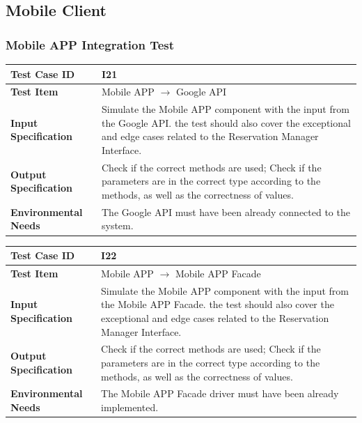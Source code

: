 \documentclass[a4paper,11pt]{article}
\begin{document}
	\subsection{Mobile Client}
		\subsubsection{Mobile APP Integration Test}
		\begin{table}[H] 
\begin{center}
\renewcommand\arraystretch{1.5}
\begin{tabular}{|p{5cm}|p{7cm}|}
 \hline
\textbf{Test Case ID}& I21\\
 \hline
\textbf{Test Item}&Mobile APP $\rightarrow$ Google API\\
 \hline
\textbf{Input Specification}&Simulate the Mobile APP component with the input from the Google API. the test should also cover the exceptional and edge cases related to the Reservation Manager Interface.\\
 \hline
\textbf{Output Specification}&Check if the correct methods are used;
Check if the parameters are in the correct type according to the methods, as well as the correctness of values.\\
 \hline
 \textbf{Environmental Needs}&The Google API must have been already connected to the system.\\
 \hline
\end{tabular}
\end{center}
\end{table}		


\begin{table}[H] 
\begin{center}
\renewcommand\arraystretch{1.5}
\begin{tabular}{|p{5cm}|p{7cm}|}
 \hline
\textbf{Test Case ID}& I22\\
 \hline
\textbf{Test Item}&Mobile APP $\rightarrow$ Mobile APP Facade\\
 \hline
\textbf{Input Specification}&Simulate the Mobile APP component with the input from the Mobile APP Facade. the test should also cover the exceptional and edge cases related to the Reservation Manager Interface.\\
 \hline
\textbf{Output Specification}&Check if the correct methods are used;
Check if the parameters are in the correct type according to the methods, as well as the correctness of values.\\
 \hline
 \textbf{Environmental Needs}&The Mobile APP Facade driver must have been already implemented.\\
 \hline
\end{tabular}
\end{center}
\end{table}		
\end{document}
